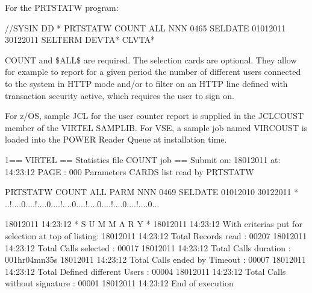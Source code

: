 \documentclass[letterpaper,10pt,english]{sphinxmanual}
\begin{document}
For the PRTSTATW program:

\begin{sphinxVerbatim}[commandchars=\\\{\}]
//SYSIN DD *
PRTSTATW COUNT \PYGZdl{}ALL\PYGZdl{} NNN 0465
SELDATE 01012011 30122011
SELTERM DEVTA* CLVTA*
\end{sphinxVerbatim}

COUNT and \$ALL\$ are required. The selection cards are optional. They allow for example to report for a given period the number of different users connected to the system in HTTP mode and/or to filter on an HTTP line defined with transaction security active, which requires the user to sign on.

For z/OS, sample JCL for the user counter report is supplied in the JCLCOUST member of the VIRTEL SAMPLIB. For VSE, a sample job named VIRCOUST is loaded into the POWER Reader Queue at installation time.

\begin{sphinxVerbatim}[commandchars=\\\{\}]
1== VIRTEL == Statistics file COUNT job ==
Submit on: 18\PYGZhy{}01\PYGZhy{}2011 at: 14:23:12              PAGE : 000
Parameters CARDS list read by PRTSTATW

PRTSTATW COUNT                  \PYGZdl{}ALL\PYGZdl{}   PARM        NNN 0469
SELDATE 01012010 30122011
* ..!....0....!....0....!....0....!....0....!....0....!....0...

18\PYGZhy{}01\PYGZhy{}2011      14:23:12                * S U M M A R Y *
18\PYGZhy{}01\PYGZhy{}2011      14:23:12                With criterias put for selection at top of listing:
18\PYGZhy{}01\PYGZhy{}2011      14:23:12                Total Records read              : 00207
18\PYGZhy{}01\PYGZhy{}2011      14:23:12                Total Calls selected            : 00017
18\PYGZhy{}01\PYGZhy{}2011      14:23:12                Total Calls duration            : 001hr04mn35s
18\PYGZhy{}01\PYGZhy{}2011      14:23:12                Total Calls ended by \PYGZdq{}Timeout\PYGZdq{}  : 00007
18\PYGZhy{}01\PYGZhy{}2011      14:23:12                Total Defined different Users   : 00004
18\PYGZhy{}01\PYGZhy{}2011      14:23:12                Total Calls without signature   : 00001
18\PYGZhy{}01\PYGZhy{}2011      14:23:12                End of execution
\end{sphinxVerbatim}


\newpage
\end{document}
